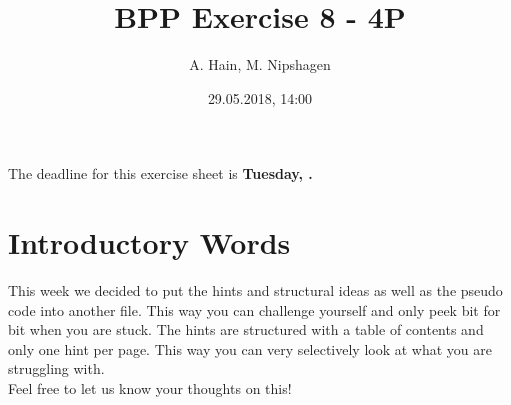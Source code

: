 
\usepackage{setspace}

\title{BPP Exercise 8 - 4P}
\author{A. Hain, M. Nipshagen}
\date{29.05.2018, 14:00}

\makeatletter
\let\thetitle\@title
\let\theauthor\@author
\let\thedate\@date
\makeatother


\newcommand\itemsub[1]{
	\begin{itemize}
		\item #1
	\end{itemize}
}





The deadline for this exercise sheet is \textbf{Tuesday, \thedate.}

\section*{Introductory Words}
This week we decided to put the hints and structural ideas as well as the pseudo code into another file.
This way you can challenge yourself and only peek bit for bit when you are stuck. The hints are structured
with a table of contents and only one hint per page. This way you can very selectively look at what you
are struggling with.\\
Feel free to let us know your thoughts on this!

